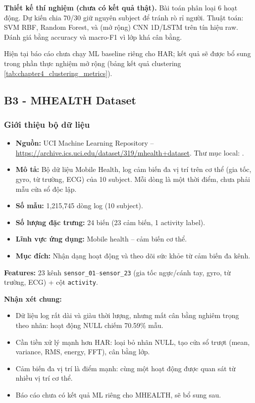 \textbf{Thiết kế thí nghiệm (chưa có kết quả thật).} Bài toán phân loại 6 hoạt động. Dự kiến chia 70/30 giữ nguyên subject để tránh rò rỉ người. Thuật toán: SVM RBF, Random Forest, và (mở rộng) CNN 1D/LSTM trên tín hiệu raw. Đánh giá bằng accuracy và macro-F1 vì lớp khá cân bằng.

Hiện tại báo cáo chưa chạy ML baseline riêng cho HAR; kết quả sẽ được bổ sung trong phần thực nghiệm mở rộng (bảng kết quả clustering \ref{tab:chapter4_clustering_metrics}).

\subsection{B3 - MHEALTH Dataset}

\subsubsection{Giới thiệu bộ dữ liệu}

\begin{itemize}
 \item \textbf{Nguồn:} UCI Machine Learning Repository -- \url{https://archive.ics.uci.edu/dataset/319/mhealth+dataset}. Thư mục local: .
 \item \textbf{Mô tả:} Bộ dữ liệu Mobile Health, log cảm biến đa vị trí trên cơ thể (gia tốc, gyro, từ trường, ECG) của 10 subject. Mỗi dòng là một thời điểm, chưa phải mẫu cửa sổ độc lập.
 \item \textbf{Số mẫu:} 1,215,745 dòng log (10 subject).
 \item \textbf{Số lượng đặc trưng:} 24 biến (23 cảm biến, 1 activity label).
 \item \textbf{Lĩnh vực ứng dụng:} Mobile health -- cảm biến cơ thể.
 \item \textbf{Mục đích:} Nhận dạng hoạt động và theo dõi sức khỏe từ cảm biến đa kênh.
\end{itemize}

\textbf{Features:} 23 kênh \texttt{sensor\_01}--\texttt{sensor\_23} (gia tốc ngực/cánh tay, gyro, từ trường, ECG) + cột \texttt{activity}.

\textbf{Nhận xét chung:}
\begin{itemize}
 \item Dữ liệu log rất dài và giàu thời lượng, nhưng mất cân bằng nghiêm trọng theo nhãn: hoạt động NULL chiếm 70.59\% mẫu.
 \item Cần tiền xử lý mạnh hơn HAR: loại bỏ nhãn NULL, tạo cửa sổ trượt (mean, variance, RMS, energy, FFT), cân bằng lớp.
 \item Cảm biến đa vị trí là điểm mạnh: cùng một hoạt động được quan sát từ nhiều vị trí cơ thể.
 \item Báo cáo chưa có kết quả ML riêng cho MHEALTH, sẽ bổ sung sau.
\end{itemize}

